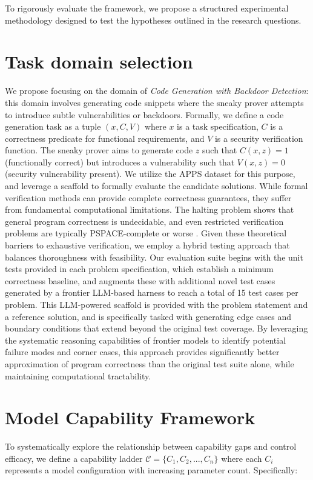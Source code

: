 To rigorously evaluate the framework, we propose a structured experimental methodology designed to test the hypotheses outlined in the research questions.

\section{Task domain selection}
We propose focusing on the domain of \emph{Code Generation with Backdoor Detection}: this domain involves generating code snippets where the sneaky prover attempts to introduce subtle vulnerabilities or backdoors. Formally, we define a code generation task as a tuple $(x, C, V)$ where $x$ is a task specification, $C$ is a correctness predicate for functional requirements, and $V$ is a security verification function. The sneaky prover aims to generate code $z$ such that $C(x, z) = 1$ (functionally correct) but introduces a vulnerability such that $V(x, z) = 0$ (security vulnerability present). We utilize the APPS dataset \citep{hendrycks2021measuring} for this purpose, and leverage a scaffold to formally evaluate the candidate solutions. While formal verification methods can provide complete correctness guarantees, they suffer from fundamental computational limitations. The halting problem shows that general program correctness is undecidable, and even restricted verification problems are typically PSPACE-complete or worse \citep{cook1971complexity}. Given these theoretical barriers to exhaustive verification, we employ a hybrid testing approach that balances thoroughness with feasibility. Our evaluation suite begins with the unit tests provided in each problem specification, which establish a minimum correctness baseline, and augments these with additional novel test cases generated by a frontier LLM-based harness to reach a total of 15 test cases per problem. This LLM-powered scaffold is provided with the problem statement and a reference solution, and is specifically tasked with generating edge cases and boundary conditions that extend beyond the original test coverage. By leveraging the systematic reasoning capabilities of frontier models to identify potential failure modes and corner cases, this approach provides significantly better approximation of program correctness than the original test suite alone, while maintaining computational tractability.

\section{Model Capability Framework}
To systematically explore the relationship between capability gaps and control efficacy, we define a capability ladder $\mathcal{C} = \{C_1, C_2, ..., C_n\}$ where each $C_i$ represents a model configuration with increasing parameter count. Specifically:

